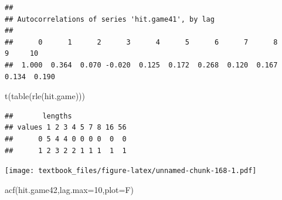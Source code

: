 \documentclass[
  11pt,
]{book}
\newenvironment{Shaded}{\begin{snugshade}}{\end{snugshade}}
\newcommand{\AttributeTok}[1]{\textcolor[rgb]{0.77,0.63,0.00}{#1}}
\newcommand{\CommentTok}[1]{\textcolor[rgb]{0.56,0.35,0.01}{\textit{#1}}}
\newcommand{\DecValTok}[1]{\textcolor[rgb]{0.00,0.00,0.81}{#1}}
\newcommand{\FunctionTok}[1]{\textcolor[rgb]{0.00,0.00,0.00}{#1}}
\newcommand{\NormalTok}[1]{#1}
\newcommand{\OtherTok}[1]{\textcolor[rgb]{0.56,0.35,0.01}{#1}}
\newcommand{\SpecialCharTok}[1]{\textcolor[rgb]{0.00,0.00,0.00}{#1}}
\newcommand{\StringTok}[1]{\textcolor[rgb]{0.31,0.60,0.02}{#1}}
\theoremstyle{definition}
\theoremstyle{definition}
\theoremstyle{definition}
\theoremstyle{definition}
\theoremstyle{remark}
\begin{document}
\begin{verbatim}
## 
## Autocorrelations of series 'hit.game41', by lag
## 
##      0      1      2      3      4      5      6      7      8      9     10 
##  1.000  0.364  0.070 -0.020  0.125  0.172  0.268  0.120  0.167  0.134  0.190
\end{verbatim}

\begin{Shaded}
\begin{Highlighting}[]
\FunctionTok{t}\NormalTok{(}\FunctionTok{table}\NormalTok{(}\FunctionTok{rle}\NormalTok{(hit.game)))}
\end{Highlighting}
\end{Shaded}

\begin{verbatim}
##       lengths
## values 1 2 3 4 5 7 8 16 56
##      0 5 4 4 0 0 0 0  0  0
##      1 2 3 2 2 1 1 1  1  1
\end{verbatim}

\newpage

\begin{Shaded}
\end{Shaded}

\texttt{[image: textbook\_files/figure-latex/unnamed-chunk-168-1.pdf]}

\begin{Shaded}
\begin{Highlighting}[]
\FunctionTok{acf}\NormalTok{(hit.game42,}\AttributeTok{lag.max=}\DecValTok{10}\NormalTok{,}\AttributeTok{plot=}\NormalTok{F)}
\end{Highlighting}
\end{Shaded}
\end{document}

